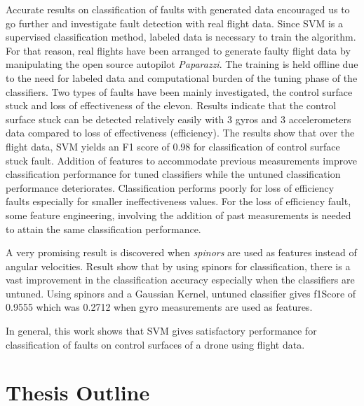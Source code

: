 Accurate results on classification of faults with generated data encouraged us to go further and investigate fault detection with real flight data. 
Since SVM is a supervised classification method, labeled data is necessary to train the algorithm. For that reason, real flights have been arranged to generate faulty flight data by manipulating the open source autopilot \emph{Paparazzi}.  
The training is held offline due to the need for labeled data and computational burden of the tuning phase of the classifiers. 
Two types of faults have been mainly investigated, the control surface stuck and loss of effectiveness of the elevon. Results indicate that the control surface stuck can be detected relatively easily with 3 gyros and 3 accelerometers data compared to loss of effectiveness (efficiency). 
The results show that over the flight data, SVM yields an F1 score of 0.98 for classification of control surface stuck fault. 
Addition of features to accommodate previous measurements improve classification performance for tuned classifiers while the untuned classification performance deteriorates. 
Classification performs poorly for loss of efficiency faults especially for smaller ineffectiveness values. 
For the loss of efficiency fault, some feature engineering, involving the addition of past measurements is needed to attain the same classification performance.

A very promising result is discovered when \emph{spinors} are used as features instead of angular velocities. 
Result show that by using spinors for classification, there is a vast improvement in the classification accuracy especially when the classifiers are untuned. Using spinors and a Gaussian Kernel, untuned classifier gives f1Score of 0.9555 which was 0.2712 when gyro measurements are used as features.

In general, this work shows that SVM gives satisfactory performance for classification of faults on control surfaces of a drone using flight data.

\section{Thesis Outline}

